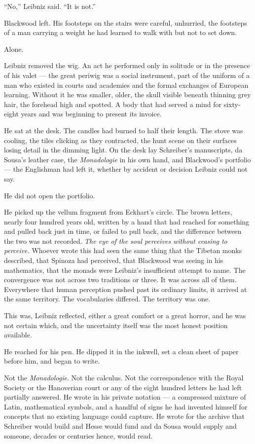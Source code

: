 ``No,'' Leibniz said. ``It is not.''

Blackwood left. His footsteps on the stairs were careful, unhurried, the footsteps of a man carrying a weight he had learned to walk with but not to set down.

\scenebreak

Alone.

Leibniz removed the wig. An act he performed only in solitude or in the presence of his valet --- the great periwig was a social instrument, part of the uniform of a man who existed in courts and academies and the formal exchanges of European learning. Without it he was smaller, older, the skull visible beneath thinning grey hair, the forehead high and spotted. A body that had served a mind for sixty-eight years and was beginning to present its invoice.

He sat at the desk. The candles had burned to half their length. The stove was cooling, the tiles clicking as they contracted, the hunt scene on their surfaces losing detail in the dimming light. On the desk lay Schreiber's manuscripts, da Sousa's leather case, the \emph{Monadologie} in his own hand, and Blackwood's portfolio --- the Englishman had left it, whether by accident or decision Leibniz could not say.

He did not open the portfolio.

He picked up the vellum fragment from Eckhart's circle. The brown letters, nearly four hundred years old, written by a hand that had reached for something and pulled back just in time, or failed to pull back, and the difference between the two was not recorded. \emph{The eye of the soul perceives without ceasing to perceive.} Whoever wrote this had seen the same thing that the Tibetan monks described, that Spinoza had perceived, that Blackwood was seeing in his mathematics, that the monads were Leibniz's insufficient attempt to name. The convergence was not across two traditions or three. It was across all of them. Everywhere that human perception pushed past its ordinary limits, it arrived at the same territory. The vocabularies differed. The territory was one.

This was, Leibniz reflected, either a great comfort or a great horror, and he was not certain which, and the uncertainty itself was the most honest position available.

He reached for his pen. He dipped it in the inkwell, set a clean sheet of paper before him, and began to write.

Not the \emph{Monadologie}. Not the calculus. Not the correspondence with the Royal Society or the Hanoverian court or any of the eight hundred letters he had left partially answered. He wrote in his private notation --- a compressed mixture of Latin, mathematical symbols, and a handful of signs he had invented himself for concepts that no existing language could capture. He wrote for the archive that Schreiber would build and Hesse would fund and da Sousa would supply and someone, decades or centuries hence, would read.


